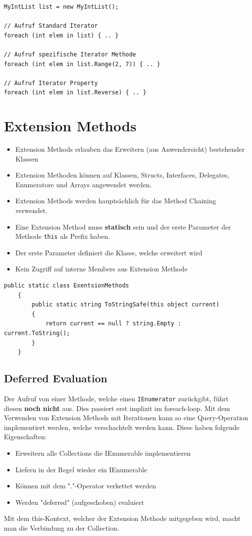\documentclass[
a4paper,
oneside,
10pt,
fleqn,
headsepline,
toc=listofnumbered, 
bibliography=totocnumbered]{scrartcl}
\let\stdsection\section
\renewcommand\section{\clearpage\stdsection}
\begin{document}
\begin{lstlisting}
MyIntList list = new MyIntList();

// Aufruf Standard Iterator
foreach (int elem in list) { .. }

// Aufruf spezifische Iterator Methode
foreach (int elem in list.Range(2, 7)) { .. }

// Aufruf Iterator Property
foreach (int elem in list.Reverse) { .. }
\end{lstlisting}

\clearpage

\section{Extension Methods}
\begin{itemize}
	\item Extension Methods erlauben das Erweitern (aus Anwendersicht) bestehender Klassen
	\item Extension Methoden können auf Klassen, Structs, Interfaces, Delegates, Enumeratore und Arrays angewendet werden.
	\item Extension Methods werden hauptsächlich für das Method Chaining verwendet.
	\item Eine Extension Method muss \textbf{statisch} sein und der erste Parameter der Methode \lstinline|this| als Prefix haben.
	\item Der erste Parameter definiert die Klasse, welche erweitert wird
	\item Kein Zugriff auf interne Members aus Extension Methode
\end{itemize}

\begin{lstlisting}[language={[Sharp]C}]
 public static class ExentsionMethods
    {
        public static string ToStringSafe(this object current)
        {
            return current == null ? string.Empty : current.ToString();
        }
    }
\end{lstlisting}
\subsection{Deferred Evaluation}
Der Aufruf von einer Methode, welche einen \lstinline|IEnumerator| zurückgibt, führt diesen \textbf{noch nicht} aus.
Dies passiert erst implizit im foreach-loop.
Mit dem Verwenden von Extension Methods mit Iterationen kann so eine Query-Operation implementiert werden, welche verschachtelt werden kann. Diese haben folgende Eigenschaften:
\begin{itemize}
	\item Erweitern alle Collections die IEnumerable implementieren
	\item Liefern in der Regel wieder ein IEnumerable
	\item Können mit dem "."-Operator verkettet werden
	\item Werden "deferred" (aufgeschoben) evaluiert
\end{itemize}
Mit dem this-Kontext, welcher der Extension Methode mitgegeben wird, macht man die Verbindung zu der Collection.
\end{document}
